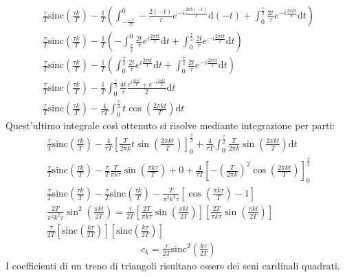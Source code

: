 \documentclass{article}
\newcommand{\sinc}{\mathrm{sinc}}
\newcommand{\df}{\mathrm{d}}
\begin{document}
\begin{gather*}
    \displaystyle\frac{\tau}{T}\sinc\left(\frac{\tau k}{T}\right)-\frac{1}{T}\left(\int_{-\frac{-\tau}{2}}^{0}-\frac{2(-t)}{\tau}e^{-i\frac{2\pi k(-t)}{T}}\df(-t)+\int_{0}^{\frac{\tau}{2}}\frac{2t}{\tau}e^{-i\frac{2\pi kt}{T}}\df t\right)\\
    \displaystyle\frac{\tau}{T}\sinc\left(\frac{\tau k}{T}\right)-\frac{1}{T}\left(-\int_{\frac{\tau}{2}}^{0}\frac{2t}{\tau}e^{i\frac{2\pi kt}{T}}\df t+\int_{0}^{\frac{\tau}{2}}\frac{2t}{\tau}e^{-i\frac{2\pi kt}{T}}\df t\right)\\
    \displaystyle\frac{\tau}{T}\sinc\left(\frac{\tau k}{T}\right)-\frac{1}{T}\left(\int^{\frac{\tau}{2}}_{0}\frac{2t}{\tau}e^{i\frac{2\pi kt}{T}}\df t+\int_{0}^{\frac{\tau}{2}}\frac{2t}{\tau}e^{-i\frac{2\pi kt}{T}}\df t\right)\\
    \displaystyle\frac{\tau}{T}\sinc\left(\frac{\tau k}{T}\right)-\frac{1}{T}\int^{\frac{\tau}{2}}_{0}\frac{4t}{\tau}\frac{e^{i\frac{2\pi kt}{T}}+e^{-i\frac{2\pi kt}{T}}}{2}\df t\\
    \displaystyle\frac{\tau}{T}\sinc\left(\frac{\tau k}{T}\right)-\frac{4}{\tau T}\int_{0}^{\frac{\tau}{2}}t\cos\left(\frac{2\pi kt}{T}\right)\df t
\end{gather*}
Quest'ultimo integrale così ottenuto si risolve mediante integrazione per parti:
\begin{gather*}
    \displaystyle\frac{\tau}{T}\sinc\left(\frac{\tau k}{T}\right)-\frac{4}{\tau T}\left[\frac{T}{2\pi k}t\sin\left(\frac{2\pi kt}{T}\right)\right]^{\frac{\tau}{2}}_0
    +\frac{4}{\tau T}\int_{0}^{\frac{\tau}{2}}\frac{T}{2\pi k}\sin\left(\frac{2\pi kt}{T}\right)\df t\\
    \displaystyle\frac{\tau}{T}\sinc\left(\frac{\tau k}{T}\right)-\frac{\tau}{T}\frac{T}{\pi k\tau}\sin\left(\frac{\pi k\tau}{T}\right)+0+
    \frac{4}{\tau T}\left[-\left(\frac{T}{2\pi k}\right)^2\cos\left(\frac{2\pi kt}{T}\right)\right]^{\frac{\tau}{2}}_0\\
    \displaystyle\frac{\tau}{T}\sinc\left(\frac{\tau k}{T}\right)-\displaystyle\frac{\tau}{T}\sinc\left(\frac{\tau k}{T}\right)-
    \frac{T}{\pi^2k^2\tau}\left[\cos\left(\frac{\pi k\tau}{T}\right)-1\right]\\
    \displaystyle\frac{2T}{\pi^2k^2\tau}\sin^2\left(\frac{\pi kt}{2T}\right)=
    \frac{\tau}{2T}\left[\frac{2T}{\pi k\tau}\sin\left(\frac{\pi kt}{2T}\right)\right]\left[\frac{2T}{\pi k\tau}\sin\left(\frac{\pi kt}{2T}\right)\right]\\
    \displaystyle\frac{\tau}{2T}\left[\sinc\left(\frac{k\tau}{2T}\right)\right]\left[\sinc\left(\frac{k\tau}{2T}\right)\right]
\end{gather*}
\begin{gather}
    c_k=\displaystyle\frac{\tau}{2T}\sinc^2\left(\frac{k\tau }{2T}\right)
\end{gather}
I coefficienti di un treno di triangoli risultano essere dei seni cardinali quadrati. 
\end{document}
